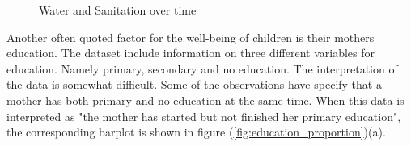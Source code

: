 \documentclass[a4paper, 11pt]{article} %
\begin{document}
\begin{figure}[h!]
    \centering
    \qquad
    \caption{Water and Sanitation over time}%
    \label{fig:water_sanitation_proportion}%
\end{figure}


Another often quoted factor for the well-being of children is their mothers education. The dataset include information on three different variables for education. Namely primary, secondary and no education. The interpretation of the data is somewhat difficult. Some of the observations have specify that a mother has both primary and no education at the same time. When this data is interpreted as "the mother has started but not finished her primary education", the corresponding barplot is shown in figure (\ref{fig:education_proportion})(a). 
\end{document}
